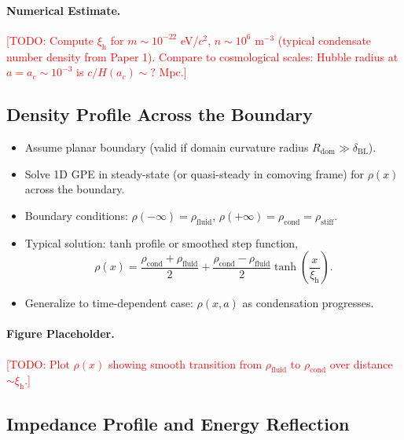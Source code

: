 \documentclass[11pt,a4paper]{article}
\newcommand{\rhostiff}{\ensuremath{\rho_{\mathrm{stiff}}}}
\newcommand{\ac}{\ensuremath{a_c}}
\newcommand{\rhofluid}{\ensuremath{\rho_{\mathrm{fluid}}}}
\newcommand{\rhocond}{\ensuremath{\rho_{\mathrm{cond}}}}
\newcommand{\xih}{\ensuremath{\xi_{\mathrm{h}}}}
\newcommand{\deltaBL}{\ensuremath{\delta_{\mathrm{BL}}}}
\theoremstyle{definition}
\theoremstyle{remark}
\begin{document}
\paragraph{Numerical Estimate.}
\textcolor{red}{[TODO: Compute $\xih$ for $m \sim 10^{-22}$ eV/$c^2$, $n \sim 10^{6}$ m$^{-3}$ (typical condensate number density from Paper 1). Compare to cosmological scales: Hubble radius at $a = \ac \sim 10^{-3}$ is $c/H(\ac) \sim ?$ Mpc.]}

\subsection{Density Profile Across the Boundary}
\label{sec:density_profile}

\begin{itemize}[leftmargin=*, itemsep=0.3em]
\item Assume planar boundary (valid if domain curvature radius $R_{\mathrm{dom}} \gg \deltaBL$).
\item Solve 1D GPE in steady-state (or quasi-steady in comoving frame) for $\rho(x)$ across the boundary.
\item Boundary conditions: $\rho(-\infty) = \rhofluid$, $\rho(+\infty) = \rhocond = \rhostiff$.
\item Typical solution: tanh profile or smoothed step function,
\begin{equation}
\rho(x) = \frac{\rhocond + \rhofluid}{2} + \frac{\rhocond - \rhofluid}{2} \tanh\left( \frac{x}{\xih} \right).
\label{eq:rho_profile}
\end{equation}
\item Generalize to time-dependent case: $\rho(x,a)$ as condensation progresses.
\end{itemize}

\paragraph{Figure Placeholder.}
\textcolor{red}{[TODO: Plot $\rho(x)$ showing smooth transition from $\rhofluid$ to $\rhocond$ over distance $\sim \xih$.]}

\subsection{Impedance Profile and Energy Reflection}
\label{sec:impedance_profile}
\end{document}
